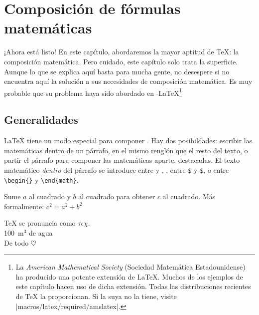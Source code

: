  
\chapter{Composición de fórmulas matemáticas}

\begin{intro}
  ¡Ahora está listo! En este capítulo, abordaremos la mayor aptitud de \TeX{}: la composición matemática.  Pero cuidado, este capítulo solo trata la superficie.  Aunque lo que se explica aquí basta para mucha gente, no desespere si no encuentra aquí la solución a sus necesidades de composición matemática.  Es muy probable que su problema haya sido abordado en \AmS-\LaTeX{}\footnote{La \emph{American Mathematical Society} (Sociedad Matemática Estadounidense) ha producido una potente extensión de \LaTeX{}.  Muchos de los ejemplos de este capítulo hacen uso de dicha extensión.  Todas las distribuciones recientes de \TeX{} la proporcionan.  Si la suya no la tiene, visite \CTANref|macros/latex/required/amslatex|.}
\end{intro}
  
\section{Generalidades}

\LaTeX{} tiene un modo especial para componer . Hay dos posibildades: escribir las matemáticas dentro de un párrafo, en el mismo renglón que el resto del texto, o partir el párrafo para componer las matemáticas aparte, destacadas.  El texto matemático \emph{dentro} del párrafo se introduce entre \ci{(} y \ci{)},
, %
entre \texttt{\$} y \texttt{\$}, o entre %
\verb|\begin{|\verb|}| y \verb|\end{math}|.
\begin{example}
Sume $a$ al cuadrado y $b$ al
cuadrado para obtener $c$ al
cuadrado.  Más formalmente:
$c^{2}=a^{2}+b^{2}$
\end{example}

\begin{example}
\TeX{} se pronuncia como
\(\tau\epsilon\chi\).\\[6pt]
100~m$^{3}$ de agua\\[6pt]
De todo 
\begin{math}\heartsuit\end{math}
\end{example}

